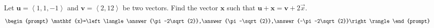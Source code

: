 \documentclass{ximera}
\author{Gregory Hartman \and Matthew Carr}
\begin{document}
\begin{exercise}




Let $\mathbf{u}=\left\langle1,1,-1\right\rangle$ and $\mathbf{v}=\left\langle2,12\right\rangle$ be two vectors. Find the vector $\mathbf{x}$ such that $\mathbf{u}+\mathbf{x}=\mathbf{v}+2\vec x$.
\[
\begin{prompt}
\mathbf{x}=\left\langle\answer{\pi-2\sqrt{2}},\answer{\pi-\sqrt{2}},\answer{-\pi-2\sqrt{2}}\right\rangle
\end{prompt}
\]

\end{exercise}
\end{document}
